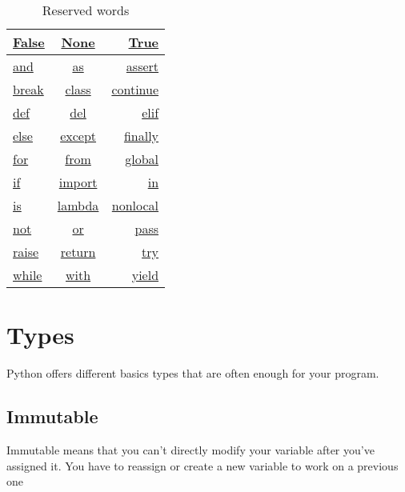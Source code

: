 \documentclass[a4paper, 12pt, titlepage]{scrartcl} %
\begin{document}
\begin{table}[h]
\begin{center}
{\renewcommand{\arraystretch}{2} %
{\setlength{\tabcolsep}{1.5cm} %
\begin{tabular}{|l|c|r|}
  \hline
  \hyperref[subsec:Bool]{False} & \hyperref[subsec:Keyword]{None} & \hyperref[subsec:Bool]{True} \\
  \hline
  \hyperref[subsec:Keyword]{and} & \hyperref[As]{as} & \hyperref[subsec:Assertion]{assert} \\
  \hline
  \hyperref[subsec:BCPR]{break} & \hyperref[sec:Class]{class} & \hyperref[subsec:BCPR]{continue} \\
  \hline
  \hyperref[sec:Function]{def} & \hyperref[Del]{del} & \hyperref[IEE]{elif} \\
  \hline
  \hyperref[subsec:Else]{else} & \hyperref[TEEF]{except} & \hyperref[TEEF]{finally} \\
  \hline
  \hyperref[subsec:For]{for} & \hyperref[subsec:Import]{from} & \hyperref[subsec:Global/Nonlocal]{global} \\
  \hline
  \hyperref[IEE]{if} & \hyperref[subsec:Import]{import} & \hyperref[Comprehension]{in} \\
  \hline
  \hyperref[subsec:Is]{is} & \hyperref[subsec:Lambda]{lambda} & \hyperref[subsec:Global/Nonlocal]{nonlocal} \\
  \hline 
  \hyperref[subsec:Keyword]{not} & \hyperref[subsec:Keyword]{or} & \hyperref[subsec:BCPR]{pass} \\
  \hline 
  \hyperref[Raise]{raise} & \hyperref[subsec:BCPR]{return} & \hyperref[TEEF]{try} \\
  \hline
  \hyperref[subsec:While]{while} & \hyperref[subsec:ContextManager]{with} & \hyperref[subsec:Generators]{yield} \\
  \hline
\end{tabular}}}
\end{center}
\caption{Reserved words}
\end{table}



\clearpage
\section{Types}
Python offers different basics types that are often enough for your program.

\subsection{Immutable}
Immutable means that you can't directly modify your variable after you've assigned it. You have to reassign or create a new variable to work on a previous one
\end{document}
